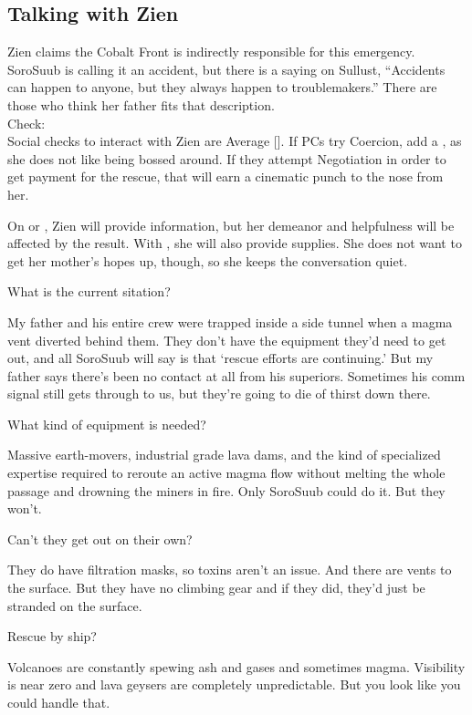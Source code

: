 \documentclass{book}
\newcommand{\df}{\difficulty}
\begin{document}
\begin{multicols*}{2}
\subsection{Talking with Zien}
Zien claims the Cobalt Front is indirectly responsible for this emergency. SoroSuub is calling it an accident, but there is a saying on Sullust, ``Accidents can happen to anyone, but they always happen to troublemakers.''  There are those who think her father fits that description.\\
Check:\\
Social checks to interact with Zien are Average [\df\df]. If PCs try Coercion, add a \setback, as she does not like being bossed around. If they attempt Negotiation in order to get payment for the rescue, that will earn a cinematic punch to the nose from her. 

On \success or \failure, Zien will provide information, but her demeanor and helpfulness will be affected by the result. With \success, she will also provide supplies. She does not want to get her mother's hopes up, though, so she keeps the conversation quiet. 

What is the current sitation?
\begin{quoting}
My father and his entire crew were trapped inside a side tunnel when a magma vent diverted behind them. They don’t have the equipment they’d need to get out, and all SoroSuub will say is that ‘rescue efforts are continuing.’ But my father says there’s been no contact at all from his superiors. Sometimes his comm signal still gets through to us, but they’re going to die of thirst down there.
\end{quoting}

What kind of equipment is needed?
\begin{quoting}
Massive earth-movers, industrial grade lava dams, and the kind of specialized expertise required to reroute an active magma flow without melting the whole passage and drowning the miners in fire. Only SoroSuub could do it. But they won’t.
\end{quoting}

Can't they get out on their own?
\begin{quoting}
They do have filtration masks, so toxins aren’t an issue. And there are vents to the surface. But they have no climbing gear and if they did, they’d just be stranded on the surface.
\end{quoting}

Rescue by ship?
\begin{quoting}
Volcanoes are constantly spewing ash and gases and sometimes magma. Visibility is near zero and lava geysers are completely unpredictable.  But you look like you could handle that.
\end{quoting}


\end{multicols*}
\end{document}
